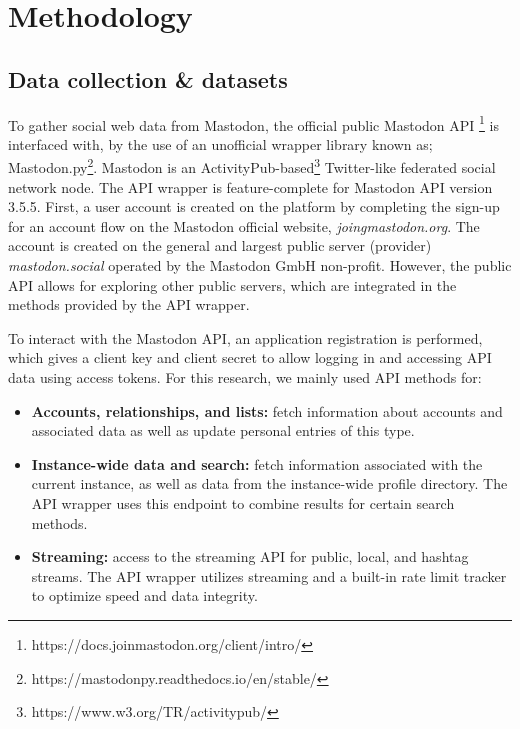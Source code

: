 \section{Methodology}
\subsection{Data collection \& datasets}
To gather social web data from Mastodon, the official public Mastodon API \footnote{https://docs.joinmastodon.org/client/intro/} is interfaced with, by the use of an unofficial wrapper library known as; Mastodon.py\footnote{https://mastodonpy.readthedocs.io/en/stable/}.
Mastodon is an ActivityPub-based\footnote{https://www.w3.org/TR/activitypub/} Twitter-like federated social network node.
The API wrapper is feature-complete for Mastodon API version 3.5.5.
First, a user account is created on the platform by completing the sign-up for an account flow on the Mastodon official website, \textit{joingmastodon.org}.
The account is created on the general and largest public server (provider) \textit{mastodon.social} operated by the Mastodon GmbH non-profit.
However, the public API allows for exploring other public servers, which are integrated in the methods provided by the API wrapper.

To interact with the Mastodon API, an application registration is performed, which gives a client key and client secret to allow logging in and accessing API data using access tokens.
For this research, we mainly used API methods for:
\begin{itemize}
  \item \textbf{Accounts, relationships, and lists:} fetch information about accounts and associated data as well as update personal entries of this type.
  \item \textbf{Instance-wide data and search:} fetch information associated with the current instance, as well as data from the instance-wide profile directory. 
  The API wrapper uses this endpoint to combine results for certain search methods.
  \item \textbf{Streaming:} access to the streaming API for public, local, and hashtag streams.
  The API wrapper utilizes streaming and a built-in rate limit tracker to optimize speed and data integrity.
\end{itemize}

